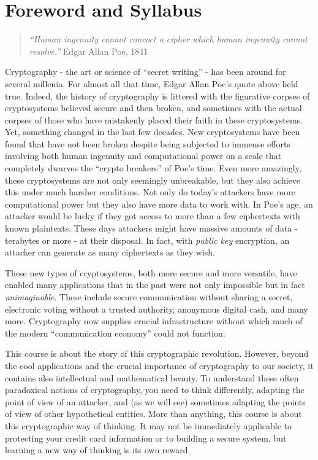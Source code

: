 \chapter{Foreword and Syllabus}\label{p-Foreword-and-Syllabus}

\begin{quote}
\emph{``Human ingenuity cannot concoct a cipher which human ingenuity
cannot resolve.''} Edgar Allan Poe, 1841
\end{quote}

Cryptography - the art or science of ``secret writing'' - has been
around for several millenia. For almost all that time, Edgar Allan Poe's
quote above held true. Indeed, the history of cryptography is littered
with the figurative corpses of cryptosystems believed secure and then
broken, and sometimes with the actual corpses of those who have
mistakenly placed their faith in these cryptosystems. Yet, something
changed in the last few decades. New cryptosystems have been found that
have not been broken despite being subjected to immense efforts
involving both human ingenuity and computational power on a scale that
completely dwarves the ``crypto breakers'' of Poe's time. Even more
amazingly, these cryptosystems are not only seemingly unbreakable, but
they also achieve this under much harsher conditions. Not only do
today's attackers have more computational power but they also have more
data to work with. In Poe's age, an attacker would be lucky if they got
access to more than a few ciphertexts with known plaintexts. These days
attackers might have massive amounts of data - terabytes or more - at
their disposal. In fact, with \emph{public key} encryption, an attacker
can generate as many ciphertexts as they wish.

These new types of cryptosystems, both more secure and more versatile,
have enabled many applications that in the past were not only impossible
but in fact \emph{unimaginable}. These include secure communication
without sharing a secret, electronic voting without a trusted authority,
anonymous digital cash, and many more. Cryptography now supplies crucial
infrastructure without which much of the modern ``communication
economy'' could not function.

This course is about the story of this cryptographic revolution.
However, beyond the cool applications and the crucial importance of
cryptography to our society, it contains also intellectual and
mathematical beauty. To understand these often paradoxical notions of
cryptography, you need to think differently, adapting the point of view
of an attacker, and (as we will see) sometimes adapting the points of
view of other hypothetical entities. More than anything, this course is
about this cryptographic way of thinking. It may not be immediately
applicable to protecting your credit card information or to building a
secure system, but learning a new way of thinking is its own reward.

